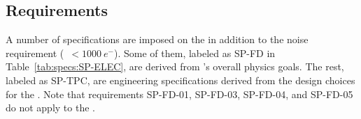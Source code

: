 \subsection{Requirements}
\label{sec:fdsp-tpcelec-overview-requirements}

A number of specifications are imposed on the  in addition to the noise requirement (~$<\SI{1000}{e^-}$). 
Some of them, labeled as SP-FD in Table~\ref{tab:specs:SP-ELEC},
are derived from 's overall physics goals. %
The rest, labeled
as SP-TPC, are engineering specifications derived from the design choices for the . %
Note that requirements SP-FD-01, SP-FD-03, SP-FD-04, and SP-FD-05 do not 
apply to the . %

\pagebreak


